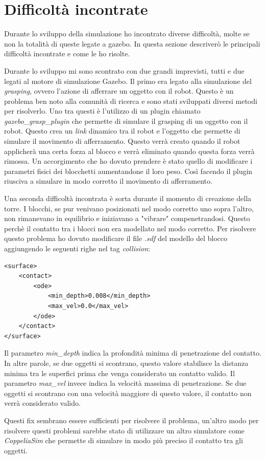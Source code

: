 \section{Difficoltà incontrate}
\label{sec:difficoltaros}
Durante lo sviluppo della simulazione ho incontrato diverse difficoltà, molte se non la totalità di queste legate a gazebo. In questa sezione descriverò le principali difficoltà incontrate e come le ho risolte.

Durante lo sviluppo mi sono scontrato con due grandi imprevisti, tutti e due legati al motore di simulazione Gazebo.
Il primo era legato alla simulazione del \textit{grasping}, ovvero l'azione di afferrare un oggetto con il robot. Questo è un problema ben noto alla comunità di ricerca e sono stati sviluppati diversi metodi per risolverlo.
Uno tra questi è l'utilizzo di un plugin chiamato \textit{gazebo\_grasp\_plugin} che permette di simulare il grasping di un oggetto con il robot. Questo crea un \textit{link} dinamico tra il robot e l'oggetto che permette di simulare il movimento di afferramento. Questo verrà creato quando il robot applicherà una certa forza al blocco e verrà eliminato quando questa forza verrà rimossa.
Un accorgimento che ho dovuto prendere è stato quello di modificare i parametri fisici dei blocchetti aumentandone il loro peso. Così facendo il plugin riusciva a simulare in modo corretto il movimento di afferramento.

Una seconda difficoltà incontrata è sorta durante il momento di creazione della torre. I blocchi, se pur venivano posizionati nel modo corretto uno sopra l'altro, non rimanevano in equilibrio e iniziavano a "vibrare" compenetrandosi. 
Questo perchè il contatto tra i blocci non era modellato nel modo corretto. Per risolvere questo problema ho dovuto modificare il file \textit{.sdf} del modello del blocco aggiungendo le seguenti righe nel tag \textit{collision}:
\begin{verbatim}
<surface>
    <contact>
        <ode>
            <min_depth>0.008</min_depth>
            <max_vel>0.0</max_vel>
        </ode>
    </contact>
</surface>
\end{verbatim}
Il parametro \textit{min\_depth} indica la profondità minima di penetrazione del contatto. In altre parole, se due oggetti si scontrano, questo valore stabilisce la distanza minima tra le superfici prima che venga considerato un contatto valido. Il parametro \textit{max\_vel} invece indica la velocità massima di penetrazione. Se due oggetti si scontrano con una velocità maggiore di questo valore, il contatto non verrà considerato valido. 

Questi fix sembrano essere sufficienti per risolvere il problema, un'altro modo per risolvere questi problemi sarebbe stato di utilizzare un altro simulatore come \textit{CoppeliaSim} che permette di simulare in modo più preciso il contatto tra gli oggetti.

